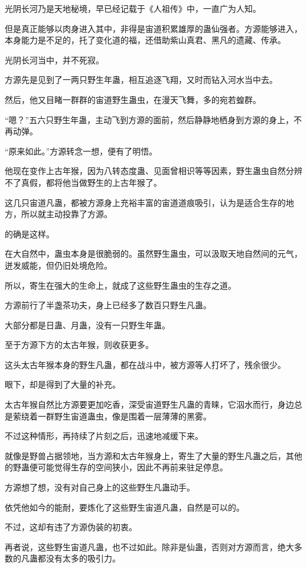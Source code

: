 \begin{this_body}
光阴长河乃是天地秘境，早已经记载于《人祖传》中，一直广为人知。

但是真正能够以肉身进入其中，非得是宙道积累雄厚的蛊仙强者。方源能够进入，本身能力是不足的，托了变化道的福，还借助紫山真君、黑凡的遗藏、传承。

光阴长河当中，并不死寂。

方源先是见到了一两只野生年蛊，相互追逐飞翔，又时而钻入河水当中去。

然后，他又目睹一群群的宙道野生蛊虫，在漫天飞舞，多的宛若蝗群。

“嗯？”五六只野生年蛊，主动飞到方源的面前，然后静静地栖身到方源的身上，不再动弹。

“原来如此。”方源转念一想，便有了明悟。

他现在变作上古年猴，因为八转态度蛊、见面曾相识等等因素，野生蛊虫自然分辨不了真假，都将他当做野生的上古年猴了。

这几只宙道凡蛊，都被方源身上充裕丰富的宙道道痕吸引，认为是适合生存的地方，所以就主动投靠了方源。

的确是这样。

在大自然中，蛊虫本身是很脆弱的。虽然野生蛊虫，可以汲取天地自然间的元气，迸发威能，但仍旧处境危险。

所以，寄生在强大的生命上，就成了这些野生蛊虫的生存之道。

方源前行了半盏茶功夫，身上已经多了数百只野生凡蛊。

大部分都是日蛊、月蛊，没有一只野生年蛊。

至于方源下方的太古年猴，则收获更多。

这头太古年猴本身的野生凡蛊，都在战斗中，被方源等人打坏了，残余很少。

眼下，却是得到了大量的补充。

太古年猴自然比方源要更加吃香，深受宙道野生凡蛊的青睐，它泅水而行，身边总是萦绕着一群野生宙道蛊虫，像是围着一层薄薄的黑雾。

不过这种情形，再持续了片刻之后，迅速地减缓下来。

就像是野兽占据领地，当方源和太古年猴身上，寄生了大量的野生凡蛊之后，其他的野蛊便可能觉得生存的空间狭小，因此不再前来驻足停息。

方源想了想，没有对自己身上的这些野生凡蛊动手。

依凭他如今的能耐，要炼化了这些野生宙道凡蛊，自然是可以的。

不过，这却有违了方源伪装的初衷。

再者说，这些野生宙道凡蛊，也不过如此。除非是仙蛊，否则对方源而言，绝大多数的凡蛊都没有太多的吸引力。


\end{this_body}
